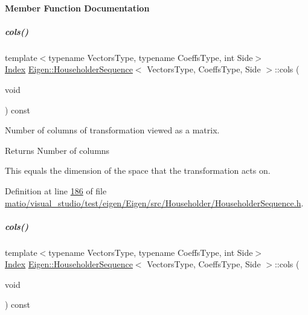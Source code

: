 \paragraph{Member Function Documentation}
\mbox{\label{group___householder___module_adcdcdd92a77810ce4bdd2b1282fe6a75}} 
\subparagraph{\texorpdfstring{cols()}{cols()}\hspace{0.1cm}{\footnotesize\ttfamily [1/2]}}
{\footnotesize\ttfamily template$<$typename Vectors\+Type, typename Coeffs\+Type, int Side$>$ \\
\hyperlink{group___core___module_a554f30542cc2316add4b1ea0a492ff02}{Index} \hyperlink{group___householder___module_class_eigen_1_1_householder_sequence}{Eigen\+::\+Householder\+Sequence}$<$ Vectors\+Type, Coeffs\+Type, Side $>$\+::cols (\begin{DoxyParamCaption}\item[{void}]{ }\end{DoxyParamCaption}) const\hspace{0.3cm}{\ttfamily [inline]}}



Number of columns of transformation viewed as a matrix. 

\begin{DoxyReturn}{Returns}
Number of columns
\end{DoxyReturn}
This equals the dimension of the space that the transformation acts on. 

Definition at line \hyperlink{matio_2visual__studio_2test_2eigen_2_eigen_2src_2_householder_2_householder_sequence_8h_source_l00186}{186} of file \hyperlink{matio_2visual__studio_2test_2eigen_2_eigen_2src_2_householder_2_householder_sequence_8h_source}{matio/visual\+\_\+studio/test/eigen/\+Eigen/src/\+Householder/\+Householder\+Sequence.\+h}.

\mbox{\label{group___householder___module_adcdcdd92a77810ce4bdd2b1282fe6a75}} 
\subparagraph{\texorpdfstring{cols()}{cols()}\hspace{0.1cm}{\footnotesize\ttfamily [2/2]}}
{\footnotesize\ttfamily template$<$typename Vectors\+Type, typename Coeffs\+Type, int Side$>$ \\
\hyperlink{group___core___module_a554f30542cc2316add4b1ea0a492ff02}{Index} \hyperlink{group___householder___module_class_eigen_1_1_householder_sequence}{Eigen\+::\+Householder\+Sequence}$<$ Vectors\+Type, Coeffs\+Type, Side $>$\+::cols (\begin{DoxyParamCaption}\item[{void}]{ }\end{DoxyParamCaption}) const\hspace{0.3cm}{\ttfamily [inline]}}




